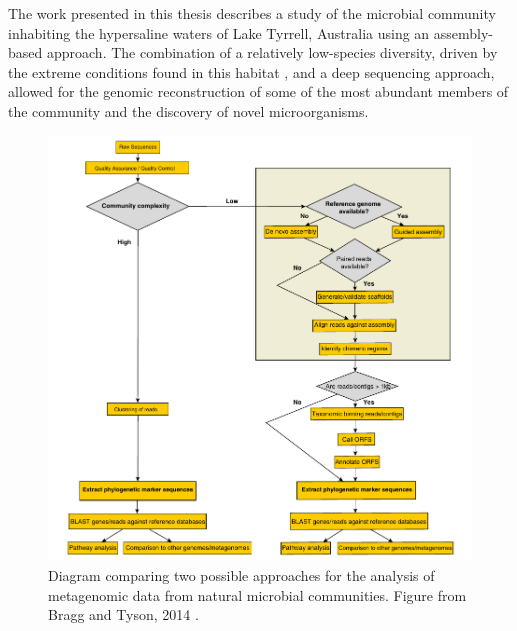 The work presented in this thesis describes a study of the microbial community inhabiting the hypersaline waters of Lake Tyrrell, Australia using an assembly-based approach. The combination of a relatively low-species diversity, driven by the extreme conditions found in this habitat  \cite{Andrei:2012he}, and a deep sequencing approach, allowed for the genomic reconstruction of some of the most abundant members of the community and the discovery of novel microorganisms.

%  
%

\begin{figure}[!htbp]
	\centering
	\includegraphics[width=\textwidth]{Chapter1/Figures/Metagenomics_GeneCentric_vs_Assembly.pdf}
	\caption{Diagram comparing two possible approaches for the analysis of metagenomic data from natural microbial communities. Figure from Bragg and Tyson, 2014 \cite{Bragg:2014kv}.}
	\label{MetagenomicComp}
\end{figure}

